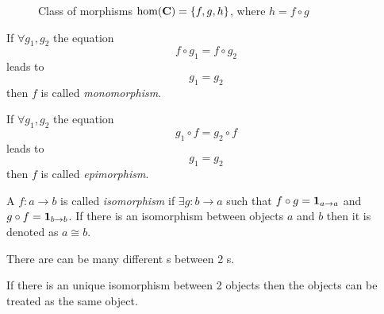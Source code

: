 \begin{figure}
  \centering
  \caption{Class of morphisms $\mathrm{hom}(\mathbf{C})=\{f,g,h\}$, where $h = f
    \circ g$}
  \label{fig:class_of_morphisms}
\end{figure}


\begin{definition}[Monomorphism]
  \label{def:monomorphism}
  If $\forall g_1, g_2$ the equation 
  \[
  f \circ g_1 = f \circ g_2
  \]
  leads to 
  \[
  g_1 = g_2
  \]
  then $f$ is called \textit{monomorphism}.
\end{definition}

\begin{definition}[Epimorphism]
  \label{def:epimorphism}
  If $\forall g_1, g_2$ the equation 
  \[
  g_1 \circ f = g_2 \circ f
  \]
  leads to 
  \[
  g_1 = g_2
  \]
  then $f$ is called \textit{epimorphism}.
\end{definition}

\begin{definition}[Isomorphism]
\label{def:isomorphism} 
A  $f: a \to b$ is called \textit{isomorphism} if
$\exists g: b \to a$ such that $f \circ g = \mathbf{1}_{ a \to a }$ 
and $g \circ f = \mathbf{1}_{ b \to b }$.  
If there is an isomorphism between objects $a$ and $b$
then it is denoted as $a \cong b$. 
\end{definition}

\begin{remark}[Isomorphism]
\label{rem:isomorphism}
There are can be many different s between 2
s. 

If there is an unique isomorphism between 2 objects then the objects
can be treated as the same object.
\end{remark}

